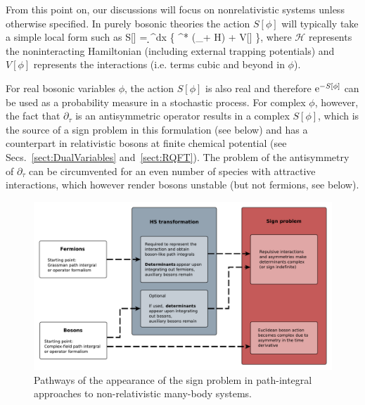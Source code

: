 \documentclass[../main.tex]{subfiles}
\begin{document}
From this point on, our discussions will focus on nonrelativistic systems unless otherwise specified.
In purely bosonic theories the action $S[\phi]$ will typically take a simple local form such as
%
\beq
\label{Eq:BosonAction}
S[\phi] = \int \d\tau \d^dx \left\{ \phi^* \left (\partial_\tau + {\mathcal H}\right) \phi + V[\phi] \right\},
\eeq
%
where $\mathcal H$ represents the noninteracting Hamiltonian (including external trapping potentials) and $V[\phi]$ represents the interactions
(i.e. terms cubic and beyond in $\phi$).

For real bosonic variables $\phi$, the action $S[\phi]$ is also real and therefore ${\rm e}^{-S[\phi]}$ can be used as a probability measure in a stochastic process.
For complex $\phi$, however, the fact that $\partial_\tau$ is an antisymmetric operator results in a complex $S[\phi]$, which is the source of
a sign problem in this formulation (see below) and has a counterpart in relativistic bosons at finite chemical potential (see Secs.~\ref{sect:DualVariables} and~\ref{sect:RQFT}).
The problem of the antisymmetry of $\partial_\tau$ can be circumvented for an even number of species with attractive interactions,
which however render bosons unstable (but not fermions, see below).

\begin{figure}[h]
  \centering
  \includegraphics[width=\columnwidth]{./1introduction/sign_problem_graph.pdf}
  \caption{\label{fig:PathIntegralsFermionsBosons} Pathways of the appearance of the sign problem in path-integral approaches to non-relativistic many-body systems.}
\end{figure}
\end{document}
